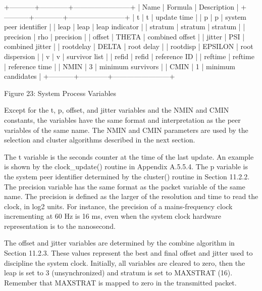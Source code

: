             +-----------+------------+------------------------+
            | Name      | Formula    | Description            |
            +-----------+------------+------------------------+
            | t         | t          | update time            |
            | p         | p          | system peer identifier |
            | leap      | leap       | leap indicator         |
            | stratum   | stratum    | stratum                |
            | precision | rho        | precision              |
            | offset    | THETA      | combined offset        |
            | jitter    | PSI        | combined jitter        |
            | rootdelay | DELTA      | root delay             |
            | rootdisp  | EPSILON    | root dispersion        |
            | v         | v          | survivor list          |
            | refid     | refid      | reference ID           |
            | reftime   | reftime    | reference time         |
            | NMIN      | 3          | minimum survivors      |
            | CMIN      | 1          | minimum candidates     |
            +-----------+------------+------------------------+

                Figure 23: System Process Variables

Except for the t, p, offset, and jitter variables and the NMIN and
CMIN constants, the variables have the same format and interpretation
as the peer variables of the same name.  The NMIN and CMIN parameters
are used by the selection and cluster algorithms described in the
next section.

The t variable is the seconds counter at the time of the last update.
An example is shown by the clock\_update() routine in
Appendix A.5.5.4.  The p variable is the system peer identifier
determined by the cluster() routine in Section 11.2.2.  The precision
variable has the same format as the packet variable of the same name.
The precision is defined as the larger of the resolution and time to
read the clock, in log2 units.  For instance, the precision of a
mains-frequency clock incrementing at 60 Hz is 16 ms, even when the
system clock hardware representation is to the nanosecond.

The offset and jitter variables are determined by the combine
algorithm in Section 11.2.3.  These values represent the best and
final offset and jitter used to discipline the system clock.
Initially, all variables are cleared to zero, then the leap is set to
3 (unsynchronized) and stratum is set to MAXSTRAT (16).  Remember
that MAXSTRAT is mapped to zero in the transmitted packet.

